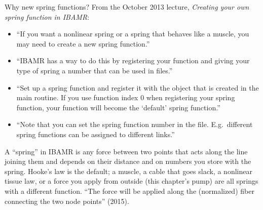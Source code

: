 \documentclass[aspectratio=169,11pt]{beamer}
\begin{document}
\begin{frame}{Why new spring functions?}
\label{fr:why}
\small From the October 2013 lecture, \emph{Creating your own spring function in IBAMR}:
\begin{itemize}
  \item ``If you want a nonlinear spring or a spring that behaves like a muscle, you may need to create a new spring function.''
  \item ``IBAMR has a way to do this by registering your function and giving your type of spring a number that can be used in  files.''
  \item ``Set up a spring function and register it with the  object that is created in the main routine. If you use function index 0 when registering your spring function, your function will become the `default' spring function.''
  \item ``Note that you can set the spring function number in the  file. E.g.\ different spring functions can be assigned to different links.''
\end{itemize}
\vspace{1mm}
\begin{punchbox}
\small A ``spring'' in IBAMR is any force between two points that acts along the line joining them and depends on their distance and on numbers you store with the spring. Hooke's law is the default; a muscle, a cable that goes slack, a nonlinear tissue law, or a force you apply from outside (this chapter's pump) are all springs with a different function. ``The force will be applied along the (normalized) fiber connecting the two node points'' (2015).
\end{punchbox}
\end{frame}
\end{document}
